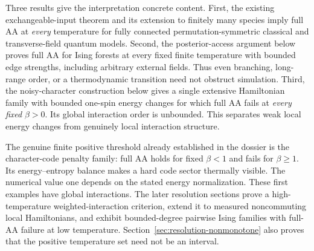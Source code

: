Three results give the interpretation concrete content. First, the
existing exchangeable-input theorem and its extension to finitely many
species imply full AA at \emph{every} temperature for fully connected
permutation-symmetric classical and transverse-field quantum models.
Second, the posterior-access argument below proves full AA for Ising
forests at every fixed finite temperature with bounded edge strengths,
including arbitrary external fields. Thus even branching, long-range
order, or a thermodynamic transition need not obstruct simulation.
Third, the noisy-character construction below gives a single extensive
Hamiltonian family with bounded one-spin energy changes for which full
AA fails at \emph{every fixed} $\beta>0$. Its global interaction order is
unbounded. This separates weak local energy changes from genuinely local
interaction structure.

The genuine finite positive threshold already established in the dossier
is the character-code penalty family: full AA holds for fixed $\beta<1$
and fails for $\beta\ge1$. Its energy--entropy balance makes a hard code
sector thermally visible. The numerical value one depends on the stated
energy normalization. These first examples have global interactions.
The later resolution sections prove a high-temperature weighted-interaction
criterion, extend it to measured noncommuting local Hamiltonians, and
exhibit bounded-degree pairwise Ising families with full-AA failure at
low temperature. Section~\ref{sec:resolution-nonmonotone} also proves
that the positive temperature set need not be an interval.
